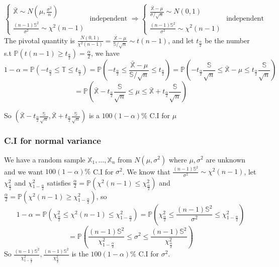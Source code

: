 $$\begin{cases}
\bar{\mathbb{X}} \sim N(\mu, \frac{\sigma^2}{n}) \\
\frac{(n-1)\mathbb{S}^2}{\sigma^2} \sim \chi^2(n-1)
\end{cases}
\text{ independent }
\Rightarrow
\begin{cases}
\frac{\bar{\mathbb{X}}-\mu}{\sigma/\sqrt{n}} \sim N(0, 1) \\
\frac{(n-1)\mathbb{S}^2}{\sigma^2} \sim \chi^2(n-1)
\end{cases}
\text{ independent }
$$
The pivotal quantity is $\frac{N(0, 1)}{\chi^2(n-1)} = \frac{\bar{\mathbb{X}}-\mu}{\mathbb{S}/\sqrt{n}} \sim t(n-1)$, and let $t_\frac{\alpha}{2}$ be the number s.t $\mathbb{P}(t(n-1) \geq t_\frac{\alpha}{2}) = \frac{\alpha}{2}$, we have
$$1-\alpha = \mathbb{P}(-t_\frac{\alpha}{2} \leq \mathbb{T} \leq t_\frac{\alpha}{2}) = \mathbb{P}(-t_\frac{\alpha}{2} \leq \frac{\bar{\mathbb{X}}-\mu}{\mathbb{S}/\sqrt{n}} \leq t_\frac{\alpha}{2}) = \mathbb{P}(-t_\frac{\alpha}{2}\frac{\mathbb{S}}{\sqrt{n}} \leq \bar{\mathbb{X}}-\mu \leq t_\frac{\alpha}{2}\frac{\mathbb{S}}{\sqrt{n}} )$$
$$= \mathbb{P}(\bar{\mathbb{X}}-t_\frac{\alpha}{2}\frac{\mathbb{S}}{\sqrt{n}} \leq \mu \leq \bar{\mathbb{X}}+t_\frac{\alpha}{2}\frac{\mathbb{S}}{\sqrt{n}})$$

So $(\bar{\mathbb{X}}-t_\frac{\alpha}{2}\frac{\mathbb{S}}{\sqrt{n}}, \bar{\mathbb{X}}+t_\frac{\alpha}{2}\frac{\mathbb{S}}{\sqrt{n}})$ is a $100(1-\alpha)\%$ C.I for $\mu$

\subsubsection{C.I for normal variance}
We have a random sample $\mathbb{X}_1, ..., \mathbb{X}_n$ from $N(\mu, \sigma^2)$ where $\mu, \sigma^2$ are unknown and we want $100(1-\alpha)\%$ C.I for $\sigma^2$. We know that $\frac{(n-1)\mathbb{S}^2}{\sigma^2} \sim \chi^2(n-1)$, let $\chi^2_\frac{\alpha}{2}$ and $\chi^2_{1-\frac{\alpha}{2}}$ satisfies $\frac{\alpha}{2} = \mathbb{P}(\chi^2(n-1) \leq \chi^2_\frac{\alpha}{2})$ and $\frac{\alpha}{2} = \mathbb{P}(\chi^2(n-1) \geq \chi^2_{1-\frac{\alpha}{2}})$, so
$$1-\alpha = \mathbb{P}(\chi^2_\frac{\alpha}{2} \leq \chi^2(n-1) \leq \chi^2_{1-\frac{\alpha}{2}}) = \mathbb{P}(\chi^2_\frac{\alpha}{2} \leq \frac{(n-1)\mathbb{S}^2}{\sigma^2} \leq \chi^2_{1-\frac{\alpha}{2}})$$
$$ = \mathbb{P}(\frac{(n-1)\mathbb{S}^2}{\chi^2_{1-\frac{\alpha}{2}}} \leq \sigma^2 \leq \frac{(n-1)\mathbb{S}^2}{\chi^2_\frac{\alpha}{2}}) $$ 
So $\frac{(n-1)\mathbb{S}^2}{\chi^2_{1-\frac{\alpha}{2}}}, \frac{(n-1)\mathbb{S}^2}{\chi^2_\frac{\alpha}{2}}$ is the $100(1-\alpha)\%$ C.I for $\sigma^2$.

